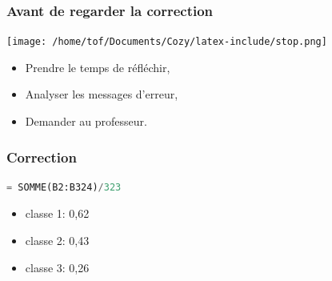 \documentclass[svgnames,11pt]{beamer}
\begin{document}
\begin{frame}
    \frametitle{Avant de regarder la correction}
\begin{center}
    \centering
    \texttt{[image: /home/tof/Documents/Cozy/latex-include/stop.png]}
    \end{center}
{\Large
    \begin{itemize}
        \item Prendre le temps de réfléchir,
        \item Analyser les messages d'erreur,
        \item Demander au professeur.
    \end{itemize}
}
\end{frame}
\begin{frame}[fragile]
    \frametitle{Correction}

    \begin{center}
        \begin{lstlisting}[language=Python , basicstyle=\small, xleftmargin=2em, xrightmargin=2em]
= SOMME(B2:B324)/323
\end{lstlisting}
        \end{center} 
\begin{itemize}
    \item classe 1: 0,62
    \item classe 2: 0,43
    \item classe 3: 0,26
\end{itemize}
\end{frame}
\end{document}
